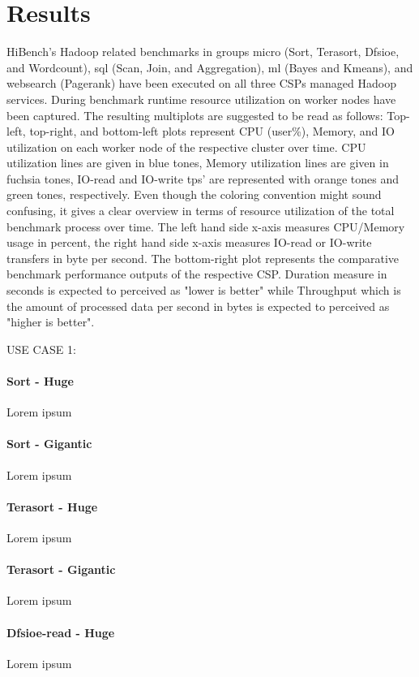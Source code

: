\documentclass[review]{elsarticle}
\begin{document}
\section{Results}
HiBench's Hadoop related benchmarks in groups micro (Sort, Terasort, Dfsioe, and Wordcount), sql (Scan, Join, and Aggregation), ml (Bayes and Kmeans), and websearch (Pagerank) have been executed on all three CSPs managed Hadoop services. During benchmark runtime resource utilization on worker nodes have been captured. The resulting multiplots are suggested to be read as follows: Top-left, top-right, and bottom-left plots represent CPU (user\%), Memory, and IO utilization on each worker node of the respective cluster over time. CPU utilization lines are given in blue tones, Memory utilization lines are given in fuchsia tones, IO-read and IO-write tps' are represented with orange tones and green tones, respectively. Even though the coloring convention might sound confusing, it gives a clear overview in terms of resource utilization of the total benchmark process over time. The left hand side x-axis measures CPU/Memory usage in percent, the right hand side x-axis measures IO-read or IO-write transfers in byte per second. The bottom-right plot represents the comparative benchmark performance outputs of the respective CSP. Duration measure in seconds is expected to perceived as "lower is better" while Throughput which is the amount of processed data per second in bytes is expected to perceived as "higher is better".

USE CASE 1: 

\paragraph{Sort - Huge} Lorem ipsum

\paragraph{Sort - Gigantic} Lorem ipsum

\paragraph{Terasort - Huge} Lorem ipsum

\paragraph{Terasort - Gigantic} Lorem ipsum

\paragraph{Dfsioe-read - Huge} Lorem ipsum
\end{document}

